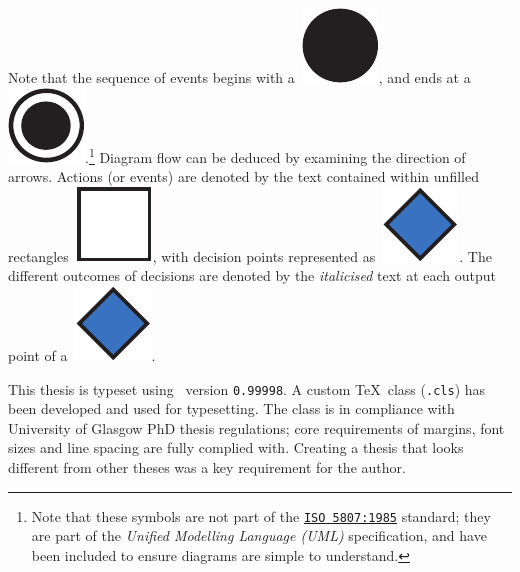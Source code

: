 \begin{preamble}
Note that the sequence of events begins with a~\includegraphics[height=\fontcharht\font`\d]{figures/ch0-example-start.pdf}, and ends at a~\includegraphics[height=\fontcharht\font`\d]{figures/ch0-example-end.pdf}.\footnote{Note that these symbols are not part of the \href{https://www.iso.org/standard/11955.html}{\texttt{ISO 5807:1985}} standard; they are part of the \emph{Unified Modelling Language (UML)} specification, and have been included to ensure diagrams are simple to understand.} Diagram flow can be deduced by examining the direction of arrows. Actions (or events) are denoted by the text contained within unfilled rectangles~\includegraphics[height=\fontcharht\font`\d]{figures/ch0-example-action.pdf}, with decision points represented as~\includegraphics[height=\fontcharht\font`\d]{figures/ch0-example-decision.pdf}. The different outcomes of decisions are denoted by the \emph{italicised} text at each output point of a~\includegraphics[height=\fontcharht\font`\d]{figures/ch0-example-decision.pdf}.

This thesis is typeset using \XeTeX\ version \texttt{0.99998}. A custom \TeX\ class (\texttt{.cls}) has been developed and used for typesetting. The class is in compliance with University of Glasgow PhD thesis regulations; core requirements of margins, font sizes and line spacing are fully complied with. Creating a thesis that looks different from other theses was a key requirement for the author.

\end{preamble}

\newpage
\thispagestyle{empty}
\mbox{}
\newpage
\thispagestyle{empty}
\mbox{}
\newpage
\mbox{}